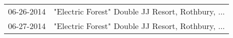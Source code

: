 \begin{supertabular}{ll}
 06-26-2014 &  "Electric Forest" Double JJ Resort, Rothbury, ... \\
 06-27-2014 &  "Electric Forest" Double JJ Resort, Rothbury, ... \\
\end{supertabular}
